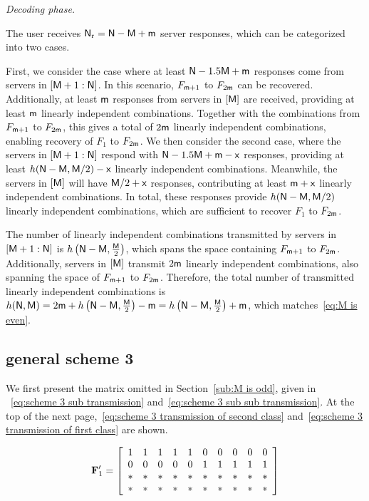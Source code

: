 \documentclass[conference,letterpaper]{IEEEtran}
\begin{document}
{\it Decoding phase.}

The user receives ${\sf N}_{\rm r} = {\sf N} - {\sf M} + {\sf m}$ server responses, which can be categorized into two cases.

First, we consider the case where at least ${\sf N} - 1.5{\sf M} + {\sf m}$ responses come from servers in $[{\sf M}+1 : {\sf N}]$. In this scenario, $F_{{\sf m}+1}$ to $F_{2{\sf m}}$ can be recovered. Additionally, at least ${\sf m}$ responses from servers in $[{\sf M}]$ are received, providing at least ${\sf m}$ linearly independent combinations. Together with the combinations from $F_{{\sf m}+1}$ to $F_{2{\sf m}}$, this gives a total of $2{\sf m}$ linearly independent combinations, enabling recovery of $F_1$ to $F_{2{\sf m}}$.
We then consider the second case, where the servers in $[{\sf M}+1: {\sf N}]$ respond with ${\sf N} - 1.5{\sf M} + {\sf m} - {\sf x}$ responses, providing at least $h({\sf N} - {\sf M}, {\sf M}/2) - {\sf x}$ linearly independent combinations. Meanwhile, the servers in $[{\sf M}]$ will have ${\sf M}/2 + {\sf x}$ responses, contributing at least ${\sf m} +{\sf x}$ linearly independent combinations. In total, these responses provide $h({\sf N} - {\sf M}, {\sf M}/2)$ linearly independent combinations, which are sufficient to recover $F_1$ to $F_{2{\sf m}}$.

The number of linearly independent combinations transmitted by servers in $[{\sf M}+1:{\sf N}]$ is $h\left({\sf N}-{\sf M}, \frac{{\sf M}}{2}\right)$, which spans the space containing $F_{{\sf m}+1}$ to $F_{2{\sf m}}$. Additionally, servers in $[{\sf M}]$ transmit $2{\sf m}$ linearly independent combinations, also spanning the space of $F_{{\sf m}+1}$ to $F_{2{\sf m}}$. Therefore, the total number of transmitted linearly independent combinations is $h({\sf N},{\sf M})= 2{\sf m} + h\left({\sf N}-{\sf M}, \frac{{\sf M}}{2}\right) - {\sf m} = h\left({\sf N}-{\sf M}, \frac{{\sf M}}{2}\right) + {\sf m}$, which matches~\eqref{eq:M is even}.
\\

\subsection{general scheme 3}
\label{general scheme 3}
\iffalse
We first present the matrix omitted in Section~\ref{sub:M is odd}, given in 
~\ref{eq:scheme 3 sub transmission} and~\ref{eq:scheme 3 sub sub transmission}. 
At the top of the next page,~\ref{eq:scheme 3 transmission of second class} 
and~\ref{eq:scheme 3 transmission of first class} are shown.



\begin{equation} \label{eq:scheme 3 sub transmission}
{\bf F}^{\prime}_1= \left[
\begin{array}{cccccccccc}
  1 & 1 & 1 & 1 & 1 & 0 & 0 & 0 & 0 & 0  \\
  0 & 0 & 0 & 0 & 0 & 1 & 1 & 1 & 1 & 1 \\
  * & * & * & * & * & * & * & * & * & * \\
  * & * & * & * & * & * & * & * & * & *
\end{array}
 \right]
\end{equation}
\end{document}

